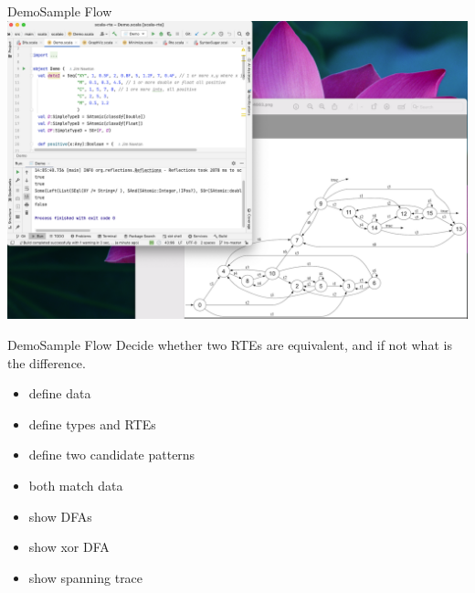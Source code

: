 \begin{frame}{Demo}{Sample Flow}
  \centering
   \includegraphics[height=0.8\textheight]{demo.png}
\end{frame}


\begin{frame}{Demo}{Sample Flow}
  Decide whether two RTEs are equivalent, and if not what is the difference.


  \begin{itemize}
  \item define data
  \item define types and RTEs
  \item define two candidate patterns
  \item both match data
  \item show DFAs
  \item show xor DFA
  \item show spanning trace
  \end{itemize}

\end{frame}



